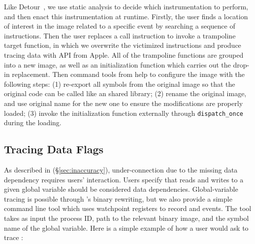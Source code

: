 Like Detour~\cite{hunt1999detours}, we use static analysis to decide which
instrumentation to perform, and then enact this instrumentation at runtime.
Firstly, the user finds a location of interest in the image related to a
specific event by searching a sequence of instructions. Then the user replaces a
call instruction to invoke a trampoline target function, in which we overwrite
the victimized instructions and produce tracing data with API from Apple.
All of the trampoline functions are grouped into a new image, as well as an
initialization function which carries out the drop-in replacement. Then command
tools from \xxx help to configure the image with the following steps: (1)
re-export all symbols from the original image so that the original code can be
called like an shared library; (2) rename the original image, and use original
name for the new one to ensure the modifications are properly loaded; (3) invoke
the initialization function externally through \texttt{dispatch\_once} during
the loading.



\subsection{Tracing Data Flags} \label{subsec:tcp}

As described in (\S\ref{sec:inaccuracy}), under-connection due to the missing
data dependency requires users' interaction. Users specify that reads and
writes to a given global variable should be considered data dependencies.
Global-variable tracing is possible through \xxx's binary rewriting, but we
also provide a simple command line tool which uses watchpoint registers to
record \dataflagwrite and \dataflagread events. The tool takes as input the
process ID, path to the relevant binary image, and the symbol name of the
global variable. Here is a simple example of how a user would ask \xxx to trace
:

